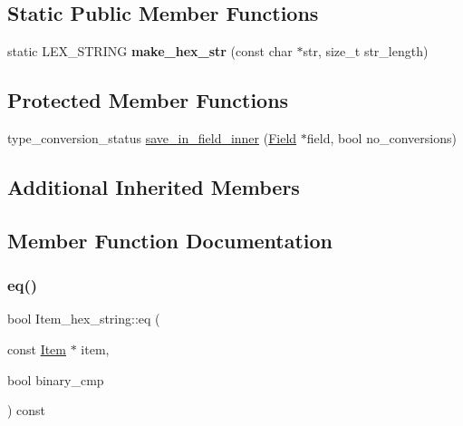 \subsection*{Static Public Member Functions}
\begin{DoxyCompactItemize}
\item 
\mbox{\label{classItem__hex__string_a702cb7e7237bc93a430f2b3d86bf358d}} 
static L\+E\+X\+\_\+\+S\+T\+R\+I\+NG {\bfseries make\+\_\+hex\+\_\+str} (const char $\ast$str, size\+\_\+t str\+\_\+length)
\end{DoxyCompactItemize}
\subsection*{Protected Member Functions}
\begin{DoxyCompactItemize}
\item 
type\+\_\+conversion\+\_\+status \mbox{\hyperlink{classItem__hex__string_adb8f37241f406ed3c4aef366d462c219}{save\+\_\+in\+\_\+field\+\_\+inner}} (\mbox{\hyperlink{classField}{Field}} $\ast$field, bool no\+\_\+conversions)
\end{DoxyCompactItemize}
\subsection*{Additional Inherited Members}


\subsection{Member Function Documentation}
\mbox{\label{classItem__hex__string_abbed37919e6473f66b9814d612ece365}} 
\subsubsection{\texorpdfstring{eq()}{eq()}}
{\footnotesize\ttfamily bool Item\+\_\+hex\+\_\+string\+::eq (\begin{DoxyParamCaption}\item[{const \mbox{\hyperlink{classItem}{Item}} $\ast$}]{item,  }\item[{bool}]{binary\+\_\+cmp }\end{DoxyParamCaption}) const\hspace{0.3cm}{\ttfamily [virtual]}}

